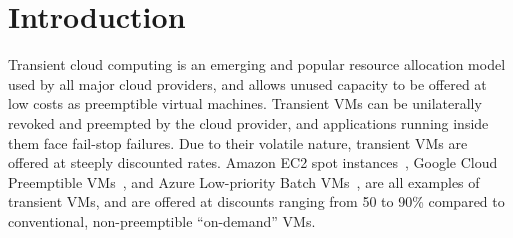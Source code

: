 \section{Introduction}
\label{sec:intro}








Transient cloud computing is an emerging and popular resource allocation model used by all major cloud providers, and allows unused capacity to be offered at low costs as preemptible virtual machines.
Transient VMs can be unilaterally revoked and preempted by the cloud provider, and applications running inside them face fail-stop failures. 
Due to their volatile nature, transient VMs are offered at steeply discounted rates. Amazon EC2 spot instances~\cite{spot-documentation}, Google Cloud Preemptible VMs~\cite{preemptible-documentation}, and Azure Low-priority Batch VMs~\cite{azure-batch}, are all examples of transient VMs, and are offered at discounts ranging from 50 to 90\% compared to conventional, non-preemptible ``on-demand'' VMs.


%



